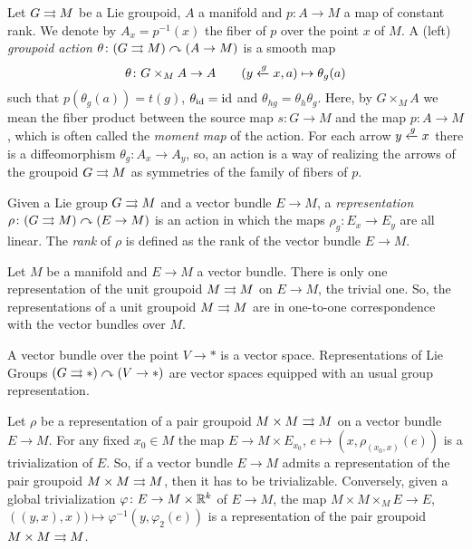 %
%

Let $G\rightrightarrows M$ be a Lie groupoid, $A$ a manifold and $p\colon A\to M$ a map of constant rank.
We denote by $A_x=p^{-1}(x)$ the fiber of $p$ over the point $x$ of $M$.
A (left) \emph{groupoid action} $\theta\colon (G\rightrightarrows M)\curvearrowright (A\to M)$ is a smooth map
\[ \theta\colon G\times_M A\to A \qquad (y\xleftarrow{g}x, a)\mapsto \theta_g(a) \]
such that $p(\theta_g(a)) = t(g)$, $\theta_{\operatorname{id}}=\operatorname{id}$ and $\theta_{hg}=\theta_h\theta_g$.
Here, by $G\times_M A$ we mean the fiber product between the source map $s\colon G\to M$ and the map $p\colon A\to M$, which is often called the \emph{moment map} of the action.
For each arrow $y\xleftarrow g x$ there is a diffeomorphism $\theta_g\colon A_x\to A_y$, so, an action is a way of realizing the arrows of the groupoid $G\rightrightarrows M$ as symmetries of the family of fibers of $p$.

Given a Lie group $G\rightrightarrows M$ and a vector bundle $E\to M$, a \emph{representation} $\rho\colon (G\rightrightarrows M)\curvearrowright (E\to M)$ is an action in which the maps $\rho_g\colon E_x\to E_y$ are all linear.
%
The \emph{rank} of $\rho$ is defined as the rank of the vector bundle $E\to M$.

\begin{example}
Let $M$ be a manifold and $E\to M$ a vector bundle.
There is only one representation of the unit groupoid $M\rightrightarrows M$ on $E\to M$, the trivial one.
So, the representations of a unit groupoid $M\rightrightarrows M$ are in one-to-one correspondence with the vector bundles over $M$.
\end{example}

\begin{example}
A vector bundle over the point $V\to *$ is a vector space.
Representations of Lie Groups $(G\rightrightarrows *)\curvearrowright (V\to *)$ are vector spaces equipped with an usual group representation.
\end{example}

\begin{example}
Let $\rho$ be a representation of a pair groupoid $M\times M\rightrightarrows M$ on a vector bundle $E\to M$.
For any fixed $x_0\in M$ the map $E\to M\times E_{x_0}$, $e\mapsto (x, \rho_{(x_0,x)}(e))$ is a trivialization of $E$.
So, if a vector bundle $E\to M$ admits a representation of the pair groupoid $M\times M\rightrightarrows M$, then it has to be trivializable.
Conversely, given a global trivialization $\varphi\colon E\to M\times\mathbb{R}^k$ of $E\to M$, the map $M\times M\times_M E \to E$, $((y,x),x))\mapsto \varphi^{-1}(y,\varphi_2(e))$ is a representation of the pair groupoid $M\times M\rightrightarrows M$.
\end{example}

